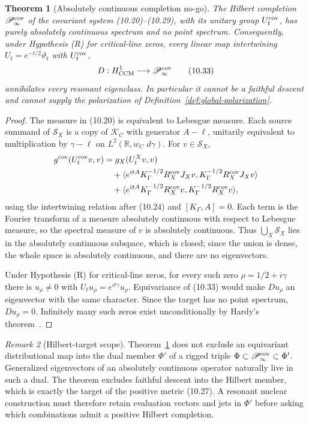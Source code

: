 \documentclass[11pt]{amsart}
\newtheorem{theorem}{Theorem}[section]
\theoremstyle{definition}
\theoremstyle{remark}
\newtheorem{remark}[theorem]{Remark}
\newcommand{\R}{\mathbb R}
\newcommand{\dd}{\,d}
\begin{document}
\begin{theorem}[Absolutely continuous completion no-go]
\label{thm:ac-no-go}
The Hilbert completion \(\mathscr P_\infty^{\rm cov}\) of the covariant
system (10.20)--(10.29), with its unitary group \(U^{\rm cov}_t\), has
purely absolutely continuous spectrum and no point spectrum.  Consequently,
under Hypothesis (R) for critical-line zeros, every linear map
intertwining \(U_t=e^{-t/2}\vartheta_t\) with \(U^{\rm cov}_t\),
\[
 D:H^1_{\rm CCM}\longrightarrow\mathscr P_\infty^{\rm cov}
 \tag{10.33}
\]
annihilates every resonant eigenclass.  In particular it cannot be a
faithful descent and cannot supply the polarization of
Definition~\ref{def:global-polarization}.
\end{theorem}

\begin{proof}
The measure in (10.20) is equivalent to Lebesgue measure.  Each source
summand of \(\mathscr S_X\) is a copy of \(\mathscr K_C\) with generator
\(A-\ell\), unitarily equivalent to multiplication by \(\gamma-\ell\) on
\(L^2(\R,w_C\,\dd\gamma)\).  For \(v\in\mathscr S_X\),
\[
\begin{aligned}
 g^{\rm cov}(U^{\rm cov}_tv,v)
 &=g_X(U^X_tv,v)\\
 &\quad+\langle e^{itA}K_\Gamma^{-1/2}R_X^{\rm cov}J_Xv,K_\Gamma^{-1/2}R_X^{\rm cov}J_Xv\rangle\\
 &\quad+\langle e^{itA}K_\Gamma^{-1/2}R_X^{\rm cov}v,K_\Gamma^{-1/2}R_X^{\rm cov}v\rangle,
\end{aligned}
\]
using the intertwining relation after (10.24) and \([K_\Gamma,A]=0\).  Each
term is the Fourier transform of a measure absolutely continuous with
respect to Lebesgue measure, so the spectral measure of \(v\) is absolutely
continuous.  Thus \(\bigcup_X\mathscr S_X\) lies in the absolutely continuous
subspace, which is closed; since the union is dense, the whole space is
absolutely continuous, and there are no eigenvectors.

Under Hypothesis (R) for critical-line zeros, for every such zero
\(\rho=1/2+i\gamma\) there is \(u_\rho\ne0\) with
\(U_tu_\rho=e^{it\gamma}u_\rho\).  Equivariance of (10.33)
would make \(Du_\rho\) an eigenvector with the same character.  Since the
target has no point spectrum, \(Du_\rho=0\).  Infinitely many such zeros
exist unconditionally by Hardy's theorem~\cite{Hardy1914}.
\end{proof}

\begin{remark}[Hilbert-target scope]
Theorem~\ref{thm:ac-no-go} does not exclude an equivariant distributional
map into the dual member \(\Phi'\) of a rigged triple
\(\Phi\subset\mathscr P_\infty^{\rm cov}\subset\Phi'\).  Generalized
eigenvectors of an absolutely continuous operator naturally live in such a
dual.  The theorem excludes faithful descent into the Hilbert member, which
is exactly the target of the positive metric (10.27).  A resonant nuclear
construction must therefore retain evaluation vectors and jets in
\(\Phi'\) before asking which combinations admit a positive Hilbert
completion.
\end{remark}
\end{document}
